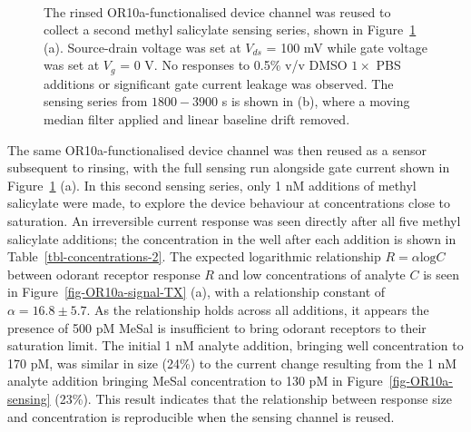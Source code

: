 \documentclass[
  a4paper,
]{scrbook}
\begin{document}
\begin{figure}
\begin{minipage}[t]{0.70\linewidth}
{{}

}

\end{minipage}%
%
\begin{minipage}[t]{0.15\linewidth}

{\centering 

~

}

\end{minipage}%

\caption{\label{fig-OR10a-responses}The rinsed OR10a-functionalised
device channel was reused to collect a second methyl salicylate sensing
series, shown in Figure~\ref{fig-OR10a-responses} (a). Source-drain
voltage was set at \(V_{ds}\) = 100 mV while gate voltage was set at
\(V_g\) = 0 V. No responses to 0.5\% v/v DMSO \(1 \times\) PBS additions
or significant gate current leakage was observed. The sensing series
from \(1800-3900\) s is shown in (b), where a moving median filter
applied and linear baseline drift removed.}

\end{figure}

The same OR10a-functionalised device channel was then reused as a sensor
subsequent to rinsing, with the full sensing run alongside gate current
shown in Figure~\ref{fig-OR10a-responses} (a). In this second sensing
series, only 1 nM additions of methyl salicylate were made, to explore
the device behaviour at concentrations close to saturation. An
irreversible current response was seen directly after all five methyl
salicylate additions; the concentration in the well after each addition
is shown in Table~\ref{tbl-concentrations-2}. The expected logarithmic
relationship \(R = \alpha\textrm{log}C\) between odorant receptor
response \(R\) and low concentrations of analyte \(C\) is seen in
Figure~\ref{fig-OR10a-signal-TX} (a), with a relationship constant of
\(\alpha =16.8\pm5.7\). As the relationship holds across all additions,
it appears the presence of 500 pM MeSal is insufficient to bring odorant
receptors to their saturation limit. The initial 1 nM analyte addition,
bringing well concentration to 170 pM, was similar in size (24\%) to the
current change resulting from the 1 nM analyte addition bringing MeSal
concentration to 130 pM in Figure~\ref{fig-OR10a-sensing} (23\%). This
result indicates that the relationship between response size and
concentration is reproducible when the sensing channel is reused.
\end{document}
